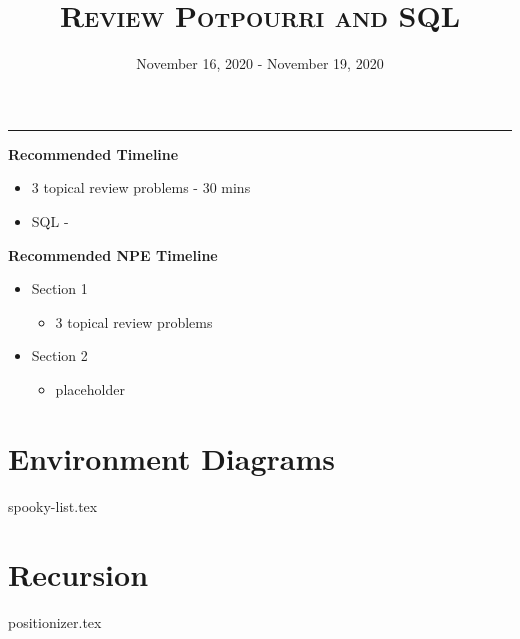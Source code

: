 \documentclass{exam}
\title{\textsc{Review Potpourri and SQL}}
\date{November 16, 2020 - November 19, 2020}
\begin{document}
\maketitle\rule{\textwidth}{0.15em}
\fontsize{12}{15}\selectfont

\begin{blocksection}
\begin{guide}
\textbf{Recommended Timeline}
\begin{itemize}
  \item 3 topical review problems - 30 mins
  \item SQL - 
\end{itemize}
\end{guide}
\end{blocksection}

\begin{blocksection}
\begin{guide}
\textbf{Recommended NPE Timeline}
  \begin{itemize}
  \item Section 1
  \begin{itemize}
    \item 3 topical review problems
  \end{itemize}
  \item Section 2
  \begin{itemize}
    \item placeholder
  \end{itemize}
\end{itemize}
\end{guide}
\end{blocksection}

\section{Environment Diagrams}
\begin{questions}
{spooky-list.tex}
\end{questions}
\newpage

\section{Recursion}
\begin{questions}
{positionizer.tex}
\end{questions}
\newpage
\end{document}
